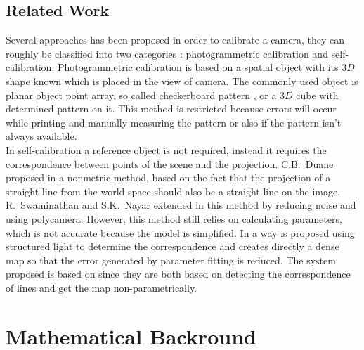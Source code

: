 \documentclass[journal,final,a4paper,twoside]{PS}
\begin{document}
\subsection{Related Work}
\label{sec:related}
Several approaches has been proposed in order to calibrate a camera, they can roughly be classified into two categories \cite{Zhang}: photogrammetric calibration and self-calibration.
Photogrammetric calibration is based on a spatial object with its $3D$ shape known which is placed in the view of camera. The commonly used object is planar object point array, so called checkerboard pattern \cite{Zhang}, or a $3D$ cube with determined pattern on it. This method is restricted because errors will occur while printing and manually measuring the pattern or also if the pattern isn't always available.\\
In self-calibration \cite{Faugeras} a reference object is not required, instead it requires the correspondence between points of the scene and the projection. C.B.~Duane proposed in \cite{Duane} a nonmetric method, based on the fact that the projection of a straight line from the world space should also be a straight line on the image. R.~Swaminathan and S.K.~Nayar extended in \cite{Swaminathan} this method by reducing noise and using polycamera. However, this method still relies on calculating parameters, which is not accurate because the model is simplified. 
In \cite{Sagawa} a way is proposed using structured light to determine the correspondence and creates directly a dense map so that the error generated by parameter fitting is reduced. 
The system proposed is based on \cite{Sagawa} since they are both based on detecting the correspondence of lines and get the map non-parametrically. %

\section{Mathematical Backround}
\label{sec:maths}
\end{document}
